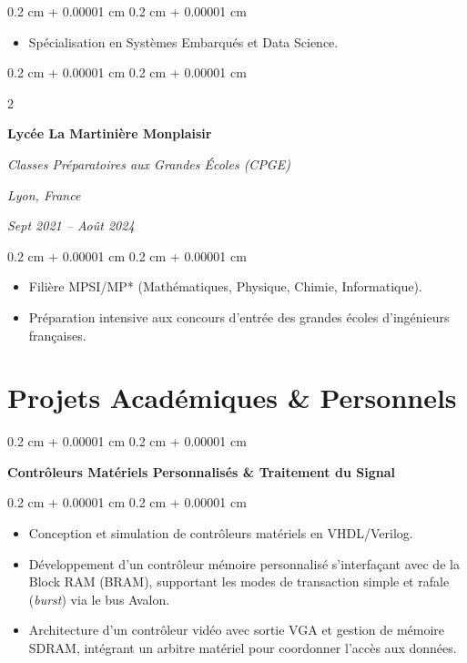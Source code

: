 \documentclass[10pt, a4]{article}
\newenvironment{highlights}{
    \begin{itemize}[
        topsep=0.10 cm,
        parsep=0.10 cm,
        partopsep=0pt,
        itemsep=0pt,
        leftmargin=0.4 cm + 10pt
    ]
}{
    \end{itemize}
} %
\newenvironment{onecolentry}{
    \begin{adjustwidth}{
        0.2 cm + 0.00001 cm
    }{
        0.2 cm + 0.00001 cm
    }
}{
    \end{adjustwidth}
} %
\newenvironment{twocolentry}[2][]{
    \onecolentry
    \def\secondColumn{#2}
    \setcolumnwidth{\fill, 4.5 cm}
    \begin{paracol}{2}
}{
    \switchcolumn \raggedleft \secondColumn
    \end{paracol}
    \endonecolentry
} %
\begin{document}
        \vspace{0.10 cm}
        \begin{onecolentry}
            \begin{highlights}
                \item Spécialisation en Systèmes Embarqués et Data Science.
            \end{highlights}
        \end{onecolentry}

        \begin{twocolentry}{
        \textit{Lyon, France}

        \textit{Sept 2021 – Août 2024}}
            \textbf{Lycée La Martinière Monplaisir}

            \textit{Classes Préparatoires aux Grandes Écoles (CPGE)}
        \end{twocolentry}

        \vspace{0.10 cm}
        \begin{onecolentry}
            \begin{highlights}
                \item Filière MPSI/MP* (Mathématiques, Physique, Chimie, Informatique).
                \item Préparation intensive aux concours d'entrée des grandes
                    écoles d'ingénieurs françaises.
            \end{highlights}
        \end{onecolentry}


    \section{Projets Académiques \& Personnels}

        \begin{onecolentry}
            \textbf{Contrôleurs Matériels Personnalisés \& Traitement du Signal}
        \end{onecolentry}
        \vspace{0.05 cm}
        \begin{onecolentry}
            \begin{highlights}
                \item Conception et simulation de contrôleurs matériels en
                    VHDL/Verilog.
                \item Développement d'un contrôleur mémoire personnalisé
                    s'interfaçant avec de la Block RAM (BRAM), supportant les
                    modes de transaction simple et rafale (\textit{burst}) via
                    le bus Avalon.
                \item Architecture d'un contrôleur vidéo avec sortie VGA et
                    gestion de mémoire SDRAM, intégrant un arbitre matériel pour
                    coordonner l'accès aux données.
            \end{highlights}
        \end{onecolentry}
        \vspace{0.2 cm}
\end{document}
